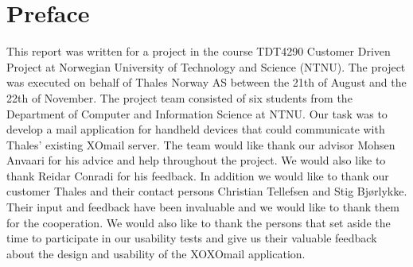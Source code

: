\chapter*{Preface}

This report was written for a project in the course TDT4290 Customer Driven Project at Norwegian University of Technology and Science (NTNU). The project was executed on behalf of Thales Norway AS between the 21th of August and the 22th of November.
\newline
\newline
The project team consisted of six students from the Department of Computer and Information Science at NTNU. Our task was to develop a mail application for handheld devices that could communicate with Thales' existing XOmail server.
\newline
\newline
The team would like thank our advisor Mohsen Anvaari for his advice and help throughout the project. We would also like to thank Reidar Conradi for his feedback. 
\newline
\newline
In addition we would like to thank our customer Thales and their contact persons Christian Tellefsen and Stig Bjørlykke. Their input and feedback have been invaluable and we would like to thank them for the cooperation. 
\newline
\newline
We would also like to thank the persons that set aside the time to participate in our usability tests and give us their valuable feedback about the design and usability of the XOXOmail application.
